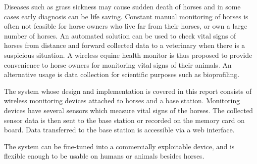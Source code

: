 Diseases such as grass sickness may cause sudden death of horses and in some cases early diagnosis can be life saving. Constant manual monitoring of horses is often not feasible for horse owners who live far from their horses, or own a large number of horses. An automated solution can be used to check vital signs of horses from distance and forward collected data to a veterinary when there is a suspicious situation. A wireless equine health monitor is thus proposed to provide convenience to horse owners for monitoring vital signs of their animals. An alternative usage is data collection for scientific purposes such as bioprofiling.

The system whose design and implementation is covered in this report consists of wireless monitoring devices attached to horses and a base station. Monitoring devices have several sensors which measure vital signs of the horses. The collected sensor data is then sent to the base station or recorded on the memory card on board. Data transferred to the base station is accessible via a web interface. 

The system can be fine-tuned into a commercially exploitable device, and is flexible enough to be usable on humans or animals besides horses.
